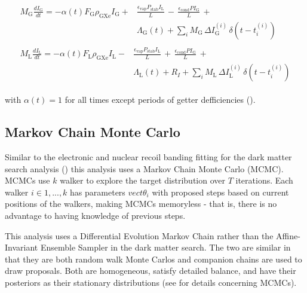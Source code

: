 \begin{subequations}
\begin{align}
\begin{split}
M_{\mathrm{G}} \frac{dI_{\mathrm{G}}}{dt} = - \alpha (t) F_{\mathrm{G}} \rho_{\mathrm{GXe}} I_{\mathrm{G}} +
& \frac{\epsilon_{\mathrm{vap}} P_{\mathrm{stab}} I_{\mathrm{L}}}{L}\, - \, \frac{\epsilon_{\mathrm{cond}} P I_{\mathrm{G}}}{L}\, + \\
& \Lambda_{\mathrm{G}}(t) + \sum_i  M_{\mathrm{G}}\, \Delta I_{\mathrm{G}}^{(i)}\, \delta (t - t_i^{(i)})
\end{split}
\\
\begin{split}
M_{\mathrm{L}} \frac{dI_{\mathrm{L}}}{dt} = -\alpha (t) F_{\mathrm{L}} \rho_{\mathrm{GXe}} I_{\mathrm{L}} -
& \frac{\epsilon_{\mathrm{vap}} P_{\mathrm{stab}} I_{\mathrm{L}}}{L}\, + \, \frac{\epsilon_{\mathrm{cond}} P I_{\mathrm{G}}}{L}\, + \\
& \Lambda_{\mathrm{L}}(t) + R_I + \sum_i  M_{\mathrm{L}}\, \Delta I_{\mathrm{L}}^{(i)}\, \delta (t - t_i^{(i)})
\end{split}
\end{align}
\end{subequations}

\noindent with $\alpha(t) = 1$ for all times except periods of getter defficiencies
().



\subsection{Markov Chain Monte Carlo}
\label{subsec:elifetime_fit_mcmc}
Similar to the electronic and nuclear recoil banding fitting for the dark matter search analysis
() this analysis uses a Markov Chain Monte Carlo (MCMC).  MCMCs use $k$ walker
to explore the target distribution
over $T$ iterations.  Each walker $i \in {1, ..., k}$ has parameters $vect{\theta}_i$ with proposed steps based on current positions of
the
walkers, making MCMCs memoryless - that is, there is no advantage to having knowledge of previous steps.

This analysis uses a Differential Evolution Markov Chain rather than the Affine-Invariant Ensemble Sampler in the dark matter
search.  The two are similar in that they are both random walk Monte Carlos and companion chains are used to draw proposals.  Both are
homogeneous, satisfy detailed balance, and have their posteriors as their stationary distributions (see
 for details concerning MCMCs).

